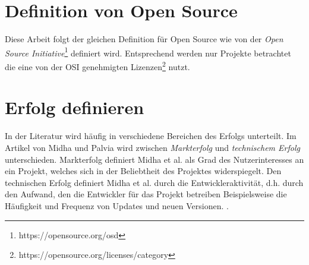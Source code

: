 \section{Definition von Open Source}

Diese Arbeit folgt der gleichen Definition für Open Source wie von der
\textit{Open Source Initiative}\footnote{https://opensource.org/osd} definiert wird. Entsprechend
werden nur Projekte betrachtet die eine von der
OSI genehmigten Lizenzen\footnote{https://opensource.org/licenses/category}
nutzt.


\section{Erfolg definieren}




In der Literatur wird häufig in verschiedene Bereichen des Erfolgs unterteilt.
Im Artikel von Midha und Palvia wird zwischen \textit{Markterfolg} und \textit{technischem Erfolg} unterschieden.
Markterfolg definiert Midha et al.
als Grad des Nutzerinteresses an ein Projekt, %
welches sich in der Beliebtheit des Projektes widerspiegelt.
Den technischen Erfolg definiert Midha et al.
durch die Entwickleraktivität, d.h. durch den Aufwand, den die Entwickler für das Projekt betreiben %
Beispielsweise die Häufigkeit und Frequenz von Updates und neuen Versionen.
\cite{midhaFactorsAffectingSuccess2012}. %


